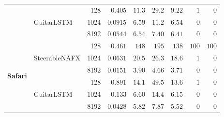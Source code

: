 \begin{table}[htbp]
\begin{tabular}{llrrrrrrr}
   & \multirow{3}{*}{GuitarLSTM} & 128 & $0.405$ & $11.3$ & $29.2$ & $9.22$ & $1$ & $0$ \\
   &  & 1024 & $0.0915$ & $6.59$ & $11.2$ & $6.54$ & $0$ & $0$ \\
   &  & 8192 & $0.0544$ & $6.54$ & $7.40$ & $6.41$ & $0$ & $0$ \\
\midrule
  \multirow{6}{*}{\textbf{Safari}} & \multirow{3}{*}{SteerableNAFX} & 128 & $0.461$ & $148$ & $195$ & $138$ & $100$ & $100$ \\
   &  & 1024 & $0.0631$ & $20.5$ & $26.3$ & $18.6$ & $1$ & $0$ \\
   &  & 8192 & $0.0151$ & $3.90$ & $4.66$ & $3.71$ & $0$ & $0$ \\
   & \multirow{3}{*}{GuitarLSTM} & 128 & $0.891$ & $14.1$ & $49.5$ & $13.6$ & $1$ & $0$ \\
   &  & 1024 & $0.133$ & $6.60$ & $14.4$ & $6.15$ & $0$ & $0$ \\
   &  & 8192 & $0.0428$ & $5.82$ & $7.87$ & $5.52$ & $0$ & $0$ \\
\bottomrule
\end{tabular}
\end{table}
